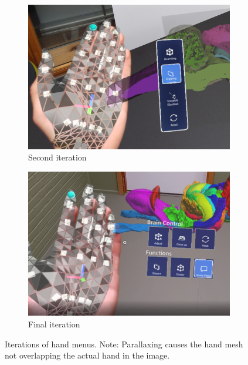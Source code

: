 \begin{figure}[h]
\begin{subfigure}[b]{0.5\textwidth}
    \includegraphics[width=\textwidth]{fig/handmenuiter2.png}
    \caption{Second iteration}
    \label{fig:hanmenuiter2}
\end{subfigure}
\begin{subfigure}[b]{0.5\textwidth}
    \includegraphics[width=\textwidth]{fig/handmenuiter3.png}
    \caption{Final iteration}
    \label{fig:hanmenuiter3}
\end{subfigure}
\caption{Iterations of hand menus. Note: Parallaxing causes the hand mesh not overlapping the actual hand in the image.}

\end{figure}

